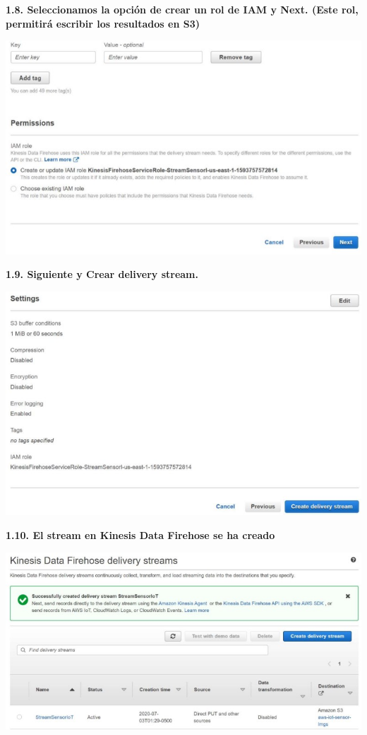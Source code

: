 \documentclass{article}
\begin{document}
	\newpage
\textbf{1.8.  Seleccionamos la opción de crear un rol de IAM y Next. (Este rol, permitirá escribir los resultados en S3)
}

    \begin{center}
		\includegraphics[width=15cm]{./images/8} 
	\end{center}
	
	\newpage
\textbf{1.9.  Siguiente y Crear delivery stream.
}

    \begin{center}
		\includegraphics[width=15cm]{./images/9} 
	\end{center}
	
		
	\newpage
\textbf{1.10.  El stream en Kinesis Data Firehose se ha creado
}

    \begin{center}
		\includegraphics[width=15cm]{./images/10} 
	\end{center}
	
\end{document}
